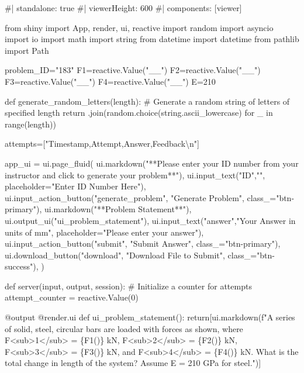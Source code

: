 \documentclass[
  letterpaper,
  DIV=11,
  numbers=noendperiod]{scrreprt}
\newenvironment{Shaded}{\begin{snugshade}}{\end{snugshade}}
\newcommand{\NormalTok}[1]{\textcolor[rgb]{0.00,0.23,0.31}{#1}}
\begin{document}
\begin{Shaded}
\begin{Highlighting}[]
\NormalTok{\#| standalone: true}
\NormalTok{\#| viewerHeight: 600}
\NormalTok{\#| components: [viewer]}

\NormalTok{from shiny import App, render, ui, reactive}
\NormalTok{import random}
\NormalTok{import asyncio}
\NormalTok{import io}
\NormalTok{import math}
\NormalTok{import string}
\NormalTok{from datetime import datetime}
\NormalTok{from pathlib import Path}

\NormalTok{problem\_ID="183"}
\NormalTok{F1=reactive.Value("\_\_")}
\NormalTok{F2=reactive.Value("\_\_")}
\NormalTok{F3=reactive.Value("\_\_")}
\NormalTok{F4=reactive.Value("\_\_")}
\NormalTok{E=210}

\NormalTok{def generate\_random\_letters(length):}
\NormalTok{    \# Generate a random string of letters of specified length}
\NormalTok{    return \textquotesingle{}\textquotesingle{}.join(random.choice(string.ascii\_lowercase) for \_ in range(length))  }

\NormalTok{attempts=["Timestamp,Attempt,Answer,Feedback\textbackslash{}n"]}

\NormalTok{app\_ui = ui.page\_fluid(}
\NormalTok{    ui.markdown("**Please enter your ID number from your instructor and click to generate your problem**"),}
\NormalTok{    ui.input\_text("ID","", placeholder="Enter ID Number Here"),}
\NormalTok{    ui.input\_action\_button("generate\_problem", "Generate Problem", class\_="btn{-}primary"),}
\NormalTok{    ui.markdown("**Problem Statement**"),}
\NormalTok{    ui.output\_ui("ui\_problem\_statement"),}
\NormalTok{    ui.input\_text("answer","Your Answer in units of mm", placeholder="Please enter your answer"),}
\NormalTok{    ui.input\_action\_button("submit", "Submit Answer", class\_="btn{-}primary"),}
\NormalTok{    ui.download\_button("download", "Download File to Submit", class\_="btn{-}success"),}
\NormalTok{)}


\NormalTok{def server(input, output, session):}
\NormalTok{    \# Initialize a counter for attempts}
\NormalTok{    attempt\_counter = reactive.Value(0)}

\NormalTok{    @output}
\NormalTok{    @render.ui}
\NormalTok{    def ui\_problem\_statement():}
\NormalTok{        return[ui.markdown(f"A series of solid, steel, circular bars are loaded with forces as shown, where F\textless{}sub\textgreater{}1\textless{}/sub\textgreater{} = \{F1()\} kN, F\textless{}sub\textgreater{}2\textless{}/sub\textgreater{} = \{F2()\} kN, F\textless{}sub\textgreater{}3\textless{}/sub\textgreater{} = \{F3()\} kN, and F\textless{}sub\textgreater{}4\textless{}/sub\textgreater{} = \{F4()\} kN. What is the total change in length of the system? Assume E = 210 GPa for steel.")]}
    

\end{Highlighting}
\end{Shaded}
\end{document}
